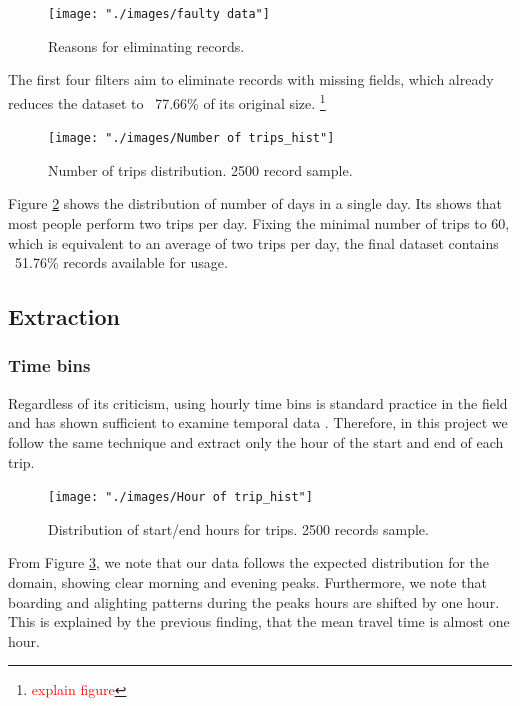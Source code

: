 \documentclass{article}
\newcommand{\selfnote}[1]{\footnote{\textcolor{red}{#1}}}
\begin{document}
\begin{figure}[H]
  \centering
  \texttt{[image: "./images/faulty data"]}
  \caption{Reasons for eliminating records.}
  \label{fig:preprocessing/faulty}
\end{figure}

The first four filters aim to eliminate records with missing fields, which already reduces the dataset to ~77.66\% of its original size. \selfnote{explain figure} 

\begin{figure}[H]
  \centering
  \texttt{[image: "./images/Number of trips\_hist"]}
  \caption{Number of trips distribution. 2500 record sample.}
  \label{fig:preprocessing/num_trips}
\end{figure}

Figure \ref{fig:preprocessing/num_trips} shows the distribution of number of days in a single day. Its shows that most people perform two trips per day. Fixing the minimal number of trips to 60, which is equivalent to an average of two trips per day, the final dataset contains ~51.76\% records available for usage.  

\subsection{Extraction}

\subsubsection{Time bins}
Regardless of its criticism, using hourly time bins is standard practice in the field and has shown sufficient to examine temporal data \cite{langlois2016inferring} \cite{ma2017understanding} \cite{morency2007measuring}. Therefore, in this project we follow the same technique and extract only the hour of the start and end of each trip.

\begin{figure}[H]
  \centering
  \texttt{[image: "./images/Hour of trip\_hist"]}
  \caption{Distribution of start/end hours for trips. 2500 records sample.}
  \label{fig:preprocessing/start_end_hour}
\end{figure}

From Figure \ref{fig:preprocessing/start_end_hour}, we note that our data follows the expected distribution for the domain, showing clear morning and evening peaks. Furthermore, we note that boarding and alighting patterns during the peaks hours are shifted by one hour. This is explained by the previous finding, that the mean travel time is almost one hour.
\end{document}
